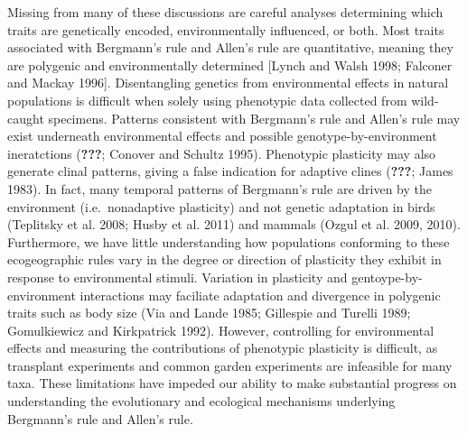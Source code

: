 \documentclass[]{article}
\begin{document}
Missing from many of these discussions are careful analyses determining
which traits are genetically encoded, environmentally influenced, or
both. Most traits associated with Bergmann's rule and Allen's rule are
quantitative, meaning they are polygenic and environmentally determined
{[}Lynch and Walsh 1998; Falconer and Mackay 1996{]}. Disentangling
genetics from environmental effects in natural populations is difficult
when solely using phenotypic data collected from wild-caught specimens.
Patterns consistent with Bergmann's rule and Allen's rule may exist
underneath environmental effects and possible genotype-by-environment
ineratctions ({\textbf{???}}; Conover and Schultz 1995). Phenotypic
plasticity may also generate clinal patterns, giving a false indication
for adaptive clines ({\textbf{???}}; James 1983). In fact, many temporal
patterns of Bergmann's rule are driven by the environment
(i.e.~nonadaptive plasticity) and not genetic adaptation in birds
(Teplitsky et al. 2008; Husby et al. 2011) and mammals (Ozgul et al.
2009, 2010). Furthermore, we have little understanding how populations
conforming to these ecogeographic rules vary in the degree or direction
of plasticity they exhibit in response to environmental stimuli.
Variation in plasticity and gentoype-by-environment interactions may
faciliate adaptation and divergence in polygenic traits such as body
size (Via and Lande 1985; Gillespie and Turelli 1989; Gomulkiewicz and
Kirkpatrick 1992). However, controlling for environmental effects and
measuring the contributions of phenotypic plasticity is difficult, as
transplant experiments and common garden experiments are infeasible for
many taxa. These limitations have impeded our ability to make
substantial progress on understanding the evolutionary and ecological
mechanisms underlying Bergmann's rule and Allen's rule.
\end{document}
